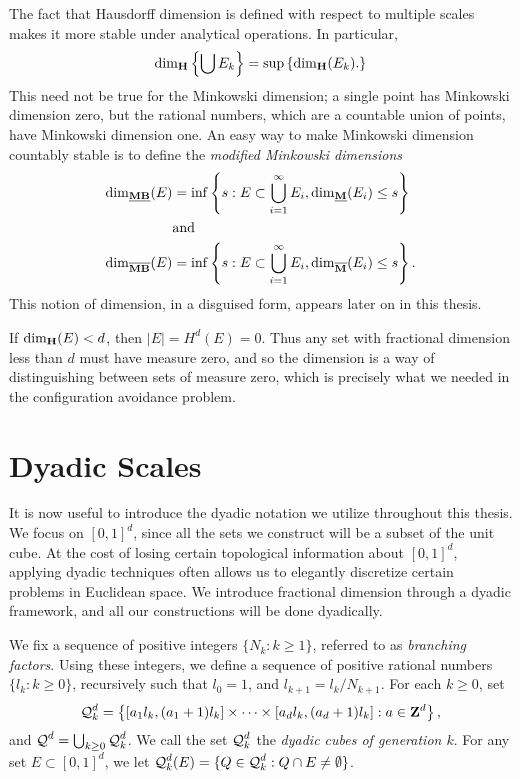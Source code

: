The fact that Hausdorff dimension is defined with respect to multiple scales makes it more stable under analytical operations. In particular,
%
\[ \operatorname{\dim_{\mathbf{H}}} \left\{ \bigcup E_k \right\} = \sup \left\{ \operatorname{\dim_{\mathbf{H}}}(E_k). \right\} \]
%
This need not be true for the Minkowski dimension; a single point has Minkowski dimension zero, but the rational numbers, which are a countable union of points, have Minkowski dimension one. An easy way to make Minkowski dimension countably stable is to define the \emph{modified Minkowski dimensions}
%
\begin{align*}
	\operatorname{\dim_{\underline{\mathbf{MB}}}}(E) &= \inf \left\{ s : E \subset \bigcup_{i = 1}^\infty E_i, \operatorname{\dim_{\underline{\mathbf{M}}}}(E_i) \leq s \right\}\\
	&\text{and}\\
	\operatorname{\dim_{\overline{\mathbf{MB}}}}(E) &= \inf \left\{ s : E \subset \bigcup_{i = 1}^\infty E_i, \operatorname{\dim_{\overline{\mathbf{M}}}}(E_i) \leq s \right\}.
\end{align*}
%
This notion of dimension, in a disguised form, appears later on in this thesis.

\begin{remark}
	If $\operatorname{\dim_{\mathbf{H}}}(E) < d$, then $|E| = H^d(E) = 0$. Thus any set with fractional dimension less than $d$ must have measure zero, and so the dimension is a way of distinguishing between sets of measure zero, which is precisely what we needed in the configuration avoidance problem.
\end{remark}







\section{Dyadic Scales}

It is now useful to introduce the dyadic notation we utilize throughout this thesis. We focus on $[0,1]^d$, since all the sets we construct will be a subset of the unit cube. At the cost of losing certain topological information about $[0,1]^d$, applying dyadic techniques often allows us to elegantly discretize certain problems in Euclidean space. We introduce fractional dimension through a dyadic framework, and all our constructions will be done dyadically.

We fix a sequence of positive integers $\{ N_k : k \geq 1 \}$, referred to as \emph{branching factors}. Using these integers, we define a sequence of positive rational numbers $\{ l_k : k \geq 0 \}$, recursively such that $l_0 = 1$, and $l_{k+1} = l_k/N_{k+1}$. For each $k \geq 0$, set
%
\[ \operatorname{\mathcal{Q}}_k^d = \left\{ [ a_1 l_k , (a_1 + 1) l_k ] \times \dots \times [ a_d l_k , (a_d + 1) l_k ] : a \in \mathbf{Z}^d \right\}, \]
%
and $\operatorname{\mathcal{Q}}^d = \bigcup_{k \geq 0} \operatorname{\mathcal{Q}}_k^d$. We call the set $\operatorname{\mathcal{Q}}_k^d$ the \emph{dyadic cubes of generation $k$}. For any set $E \subset [0,1]^d$, we let $\operatorname{\mathcal{Q}}_k^d(E) = \{ Q \in \operatorname{\mathcal{Q}}_k^d : Q \cap E \neq \emptyset \}$.

